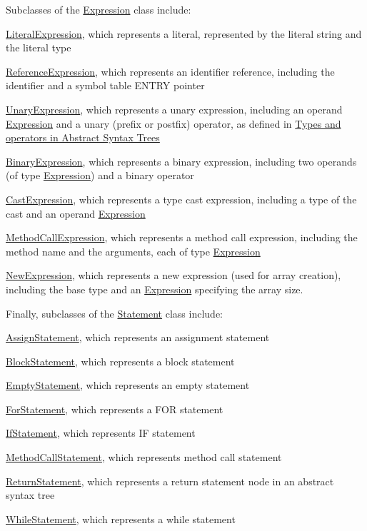 Subclasses of the \hyperlink{classExpression}{Expression} class include:
\begin{DoxyItemize}
\item \hyperlink{classLiteralExpression}{LiteralExpression}, which represents a literal, represented by the literal string and the literal type
\item \hyperlink{classReferenceExpression}{ReferenceExpression}, which represents an identifier reference, including the identifier and a symbol table ENTRY pointer
\item \hyperlink{classUnaryExpression}{UnaryExpression}, which represents a unary expression, including an operand \hyperlink{classExpression}{Expression} and a unary (prefix or postfix) operator, as defined in \hyperlink{main_TYPES}{Types and operators in Abstract Syntax Trees}
\item \hyperlink{classBinaryExpression}{BinaryExpression}, which represents a binary expression, including two operands (of type \hyperlink{classExpression}{Expression}) and a binary operator
\item \hyperlink{classCastExpression}{CastExpression}, which represents a type cast expression, including a type of the cast and an operand \hyperlink{classExpression}{Expression}
\item \hyperlink{classMethodCallExpression}{MethodCallExpression}, which represents a method call expression, including the method name and the arguments, each of type \hyperlink{classExpression}{Expression}
\item \hyperlink{classNewExpression}{NewExpression}, which represents a new expression (used for array creation), including the base type and an \hyperlink{classExpression}{Expression} specifying the array size.
\end{DoxyItemize}

Finally, subclasses of the \hyperlink{classStatement}{Statement} class include:
\begin{DoxyItemize}
\item \hyperlink{classAssignStatement}{AssignStatement}, which represents an assignment statement
\item \hyperlink{classBlockStatement}{BlockStatement}, which represents a block statement
\item \hyperlink{classEmptyStatement}{EmptyStatement}, which represents an empty statement
\item \hyperlink{classForStatement}{ForStatement}, which represents a FOR statement
\item \hyperlink{classIfStatement}{IfStatement}, which represents IF statement
\item \hyperlink{classMethodCallStatement}{MethodCallStatement}, which represents method call statement
\item \hyperlink{classReturnStatement}{ReturnStatement}, which represents a return statement node in an abstract syntax tree
\item \hyperlink{classWhileStatement}{WhileStatement}, which represents a while statement
\end{DoxyItemize}

